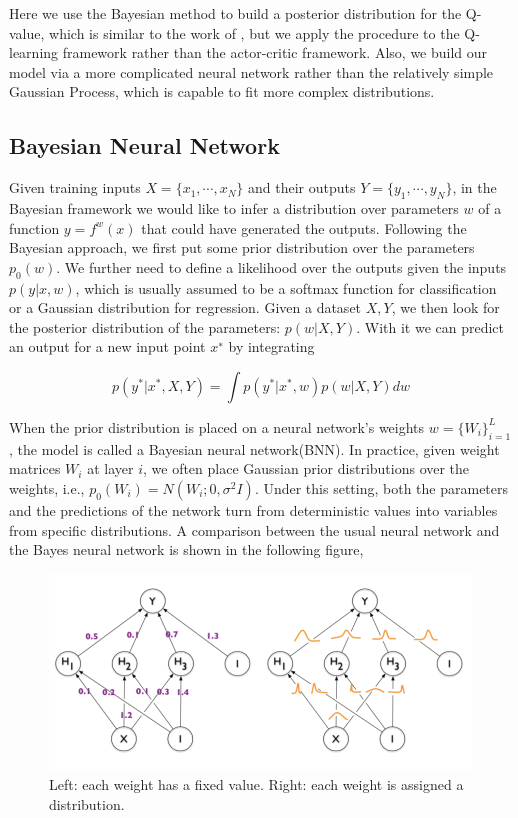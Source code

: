 \documentclass[a4paper,12pt]{article}
\begin{document}
Here we use the Bayesian method to build a posterior distribution for the Q-value, which is similar to the work of \cite{BAC}, but we apply the procedure to the Q-learning framework rather than the actor-critic framework. Also, we build our model via a more complicated neural network rather than the relatively simple Gaussian Process, which is capable to fit more complex distributions. 

\subsection{Bayesian Neural Network}
Given training inputs $X = \{x_1, \cdots , x_N\}$ and their outputs $Y = \{y_1 , \cdots, y_N\}$, in the Bayesian framework we would like to infer a distribution over parameters $w$ of a function $y = f^w(x)$ that could have generated the outputs. Following the Bayesian approach, we first put some prior distribution over the parameters $p_0(w)$. We further need to define a likelihood over the outputs given the inputs $p(y|x, w)$, which is usually assumed to be a softmax function for classification or a Gaussian distribution for regression. Given a dataset $X, Y$, we then look for the posterior distribution of the parameters: $p(w|X, Y)$. With it we can predict an output for a new input point $x^∗$ by integrating

\begin{equation}
p(y^* | x^*, X, Y) = \int p(y^*|x^*, w)p(w|X, Y)dw
\end{equation}

When the prior distribution is placed on a neural network's weights $w = \{W_i\}^L_{i=1}$ , the model is called a Bayesian neural network(BNN). In practice, given weight matrices $W_i$ at layer $i$, we often place Gaussian prior distributions over the weights, i.e., $p_0(W_i) = N (W_i ; 0, \sigma^2 I)$. Under this setting, both the parameters and the predictions of the network turn from deterministic values into variables from specific distributions. A comparison between the usual neural network and the Bayes neural network is shown in the following figure, 

\begin{figure}[htb!]
\center
\includegraphics[scale=0.6]{bnn}
\caption{Left: each weight has a fixed value. Right: each weight is assigned a distribution.}
\end{figure}
\end{document}

